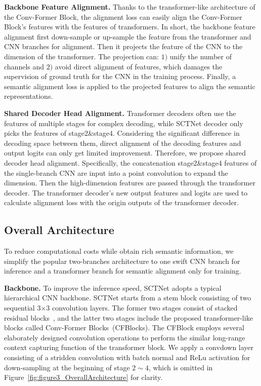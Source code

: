 \documentclass[letterpaper]{article} %
\begin{document}
\noindent
{\bf Backbone Feature Alignment.}
Thanks to the transformer-like architecture of the Conv-Former Block, the alignment loss can easily align the Conv-Former Block's features with the features of transformers. In short, the backbone feature alignment first down-sample or up-sample the feature from the transformer and CNN branches for alignment. Then it projects the feature of the CNN to the dimension of the transformer. The projection can: $1)$ unify the number of channels and $2)$ avoid direct alignment of features, which damages the supervision of ground truth for the CNN in the training process. Finally, a semantic alignment loss is applied to the projected features to align the semantic representations.

\noindent
{\bf Shared Decoder Head Alignment.}
Transformer decoders often use the features of multiple stages for complex decoding, while SCTNet decoder only picks the features of stage2\&stage4. Considering the significant difference in decoding space between them, direct alignment of the decoding features and output logits can only get limited improvement. Therefore, we propose shared decoder head alignment. Specifically, the concatenation stage2\&stage4 features of the single-branch CNN are input into a point convolution to expand the dimension. Then the high-dimension features are passed through the transformer decoder. The transformer decoder's new output features and logits are used to calculate alignment loss with the origin outputs of the transformer decoder.


\subsection{Overall Architecture}
To reduce computational costs while obtain rich semantic information, we simplify the popular two-branches architecture to one swift CNN branch for inference and a transformer branch for semantic alignment only for training.

\noindent
{\bf Backbone.}
To improve the inference speed, SCTNet adopts a typical hierarchical CNN backbone. SCTNet starts from a stem block consisting of two sequential 3$\times$3 convolution layers. The former two stages consist of stacked residual blocks~\cite{he2016deep}, and the latter two stages include the proposed transformer-like blocks called Conv-Former Blocks~(CFBlocks). The CFBlock employs several elaborately designed convolution operations to perform the similar long-range context capturing function of the transformer block. We apply a convdown layer consisting of a stridden convolution with batch normal and ReLu activation for down-sampling at the beginning of stage $2\sim4$, which is omitted in Figure~\ref{fig:figure3_OverallArchitecture} for clarity.
\end{document}
